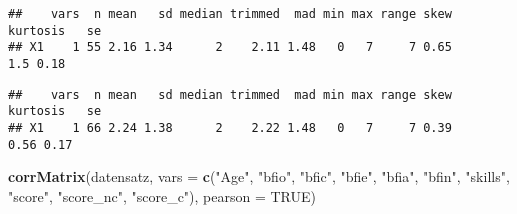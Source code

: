 \documentclass[]{article}
\newenvironment{Shaded}{\begin{snugshade}}{\end{snugshade}}
\newcommand{\KeywordTok}[1]{\textcolor[rgb]{0.13,0.29,0.53}{\textbf{#1}}}
\newcommand{\DataTypeTok}[1]{\textcolor[rgb]{0.13,0.29,0.53}{#1}}
\newcommand{\StringTok}[1]{\textcolor[rgb]{0.31,0.60,0.02}{#1}}
\newcommand{\OtherTok}[1]{\textcolor[rgb]{0.56,0.35,0.01}{#1}}
\newcommand{\OperatorTok}[1]{\textcolor[rgb]{0.81,0.36,0.00}{\textbf{#1}}}
\newcommand{\NormalTok}[1]{#1}
\begin{document}
\begin{verbatim}
##    vars  n mean   sd median trimmed  mad min max range skew kurtosis   se
## X1    1 55 2.16 1.34      2    2.11 1.48   0   7     7 0.65      1.5 0.18
\end{verbatim}

\begin{Shaded}
\end{Shaded}

\begin{verbatim}
##    vars  n mean   sd median trimmed  mad min max range skew kurtosis   se
## X1    1 66 2.24 1.38      2    2.22 1.48   0   7     7 0.39     0.56 0.17
\end{verbatim}

\begin{Shaded}
\begin{Highlighting}[]
\KeywordTok{corrMatrix}\NormalTok{(datensatz, }\DataTypeTok{vars =} \KeywordTok{c}\NormalTok{(}\StringTok{"Age"}\NormalTok{, }\StringTok{"bfio"}\NormalTok{, }\StringTok{"bfic"}\NormalTok{, }\StringTok{"bfie"}\NormalTok{, }\StringTok{"bfia"}\NormalTok{, }\StringTok{"bfin"}\NormalTok{, }\StringTok{"skills"}\NormalTok{, }\StringTok{"score"}\NormalTok{, }\StringTok{"score_nc"}\NormalTok{, }\StringTok{"score_c"}\NormalTok{), }\DataTypeTok{pearson =} \OtherTok{TRUE}\NormalTok{)}
\end{Highlighting}
\end{Shaded}
\end{document}
